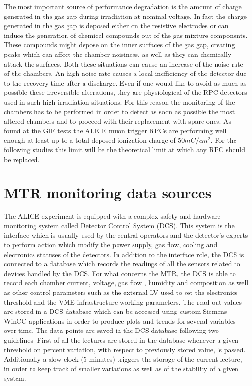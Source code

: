 The most important source of performance degradation is the amount of charge generated in the gas gap during irradiation at nominal voltage.
In fact the charge generated in the gas gap is deposed either on the resistive electrodes or can induce the generation of chemical compounds out of the gas mixture components.
These compounds might depose on the inner surfaces of the gas gap, creating peaks which can affect the chamber noisiness, as well as they can chemically attack the surfaces.
Both these situations can cause an increase of the noise rate of the chambers.
An high noise rate causes a local inefficiency of the detector due to the recovery time after a discharge.
Even if one would like to avoid as much as possible these irreversible alterations, they are physiological of the RPC detectors used in such high irradiation situations.
For this reason the monitoring of the chambers has to be performed in order to detect as soon as possible the most altered chambers and to proceed with their replacement with spare ones.
As found at the GIF tests the ALICE muon trigger RPCs are performing well enough at least up to a total deposed ionization charge of $50mC/cm^2$.
For the following studies this limit will be the theoretical limit at which any RPC should be replaced.

\section{MTR monitoring data sources}
The ALICE experiment is equipped with a complex safety and hardware monitoring system called Detector Control System (DCS).
This system is the interface which is usually used by the central operators and the detector's experts to perform action which modify the power supply, gas flow, cooling and electronics statuses of the detectors.
In addition to the interface role, the DCS is connected to a database which records the readings of all the sensors related to devices handled by the DCS.
For what concerns the MTR, the DCS is able to record each chamber current, voltage, gas flow , humidity and composition as well as other control parameters such as the external LV used to set the electronics threshold and the VME infrastructure working parameters.
The read out values are stored in a DCS database which can be accessed using custom Siemens WinCC applications in order to produce plots and trends for several variables over time.
The data points are saved in the DCS database following two guidelines.
First of all the lectures are stored in the database whenever a given threshold on percent variation, with respect to previously stored value, is passed.
Additionally a slow clock ($5$ minutes) triggers the storage of the current lecture, in order to keep track of smaller variations as well as of the stability of a given system.

